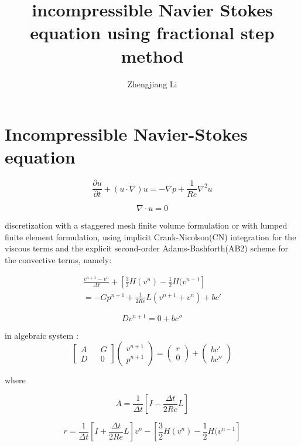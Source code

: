 \documentclass[11pt]{article}
\begin{document}
\title{incompressible Navier Stokes equation using fractional step method}

\author{Zhengjiang Li}

\date{}

\maketitle

\section {Incompressible Navier-Stokes equation}

	$$ \frac{\partial u}{\partial t} + ( u \cdot \nabla) u = - \nabla p + \frac{1}{Re} \nabla^2 u $$

	$$ \nabla \cdot u = 0 $$


discretization with a staggered mesh finite volume formulation or with lumped finite element formulation, using implicit Crank-Nicolson(CN) integration for the viscous terms and the explicit second-order Adams-Bashforth(AB2) scheme for the convective terms, namely:

\begin{align*}
  \frac{v^{n+1} - v^n}{\Delta t} + [\frac{3}{2} H(v^n) - \frac{1}{2} H(v^{n-1}] \\
 = -G p^{n+1} + \frac{1}{2Re} L(v^{n+1} + v^n) + bc' 
\end{align*}

$$ D v^{n+1} = 0 + bc'' $$

in algebraic system :
$$ 
\begin{bmatrix} A && G \\ D && 0 \end{bmatrix} \begin{pmatrix} v^{n+1} \\ p^{n+1} \end{pmatrix} = \left( \begin{array}{c} r \\ 0 \end{array} \right) + \left ( \begin{array}{c} bc' \\ bc'' \end{array} \right) $$

where

$$ A = \frac{1}{\Delta t} [ I - \frac{\Delta t}{2Re}L] $$

$$ r = \frac{1}{\Delta t} [ I + \frac{\Delta t}{2Re} L] v^n - [\frac{3}{2} H(v^n) - \frac{1}{2} H(v^{n-1}] $$
\end{document}

